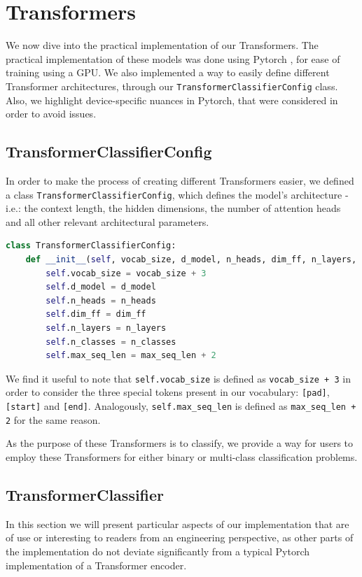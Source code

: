 \section{Transformers}

We now dive into the practical implementation of our Transformers. The practical implementation of these models was done using Pytorch \cite{pytorch}, for ease of training using a GPU. We also implemented a way to easily define different Transformer architectures, through our \verb|TransformerClassifierConfig| class. Also, we highlight device-specific nuances in Pytorch, that were considered in order to avoid issues.

\subsection{TransformerClassifierConfig}
 
In order to make the process of creating different Transformers easier, we defined a class \verb|TransformerClassifierConfig|, which defines the model's architecture - i.e.: the context length, the hidden dimensions, the number of attention heads and all other relevant architectural parameters.

\begin{lstlisting}[language=Python, caption=TransformerClassifierConfig definition, label=code:classifier_config]
class TransformerClassifierConfig:
    def __init__(self, vocab_size, d_model, n_heads, dim_ff, n_layers, n_classes, max_seq_len):
        self.vocab_size = vocab_size + 3
        self.d_model = d_model
        self.n_heads = n_heads
        self.dim_ff = dim_ff
        self.n_layers = n_layers
        self.n_classes = n_classes
        self.max_seq_len = max_seq_len + 2
\end{lstlisting}

We find it useful to note that \verb|self.vocab_size| is defined as \verb|vocab_size + 3| in order to consider the three special tokens present in our vocabulary: \verb|[pad]|, \verb|[start]| and \verb|[end]|. Analogously, \verb|self.max_seq_len| is defined as \verb|max_seq_len + 2| for the same reason.

As the purpose of these Transformers is to classify, we provide a way for users to employ these Transformers for either binary or multi-class classification problems.

\subsection{TransformerClassifier}
In this section we will present particular aspects of our implementation that are of use or interesting to readers from an engineering perspective, as other parts of the implementation do not deviate significantly from a typical Pytorch implementation of a Transformer encoder.

